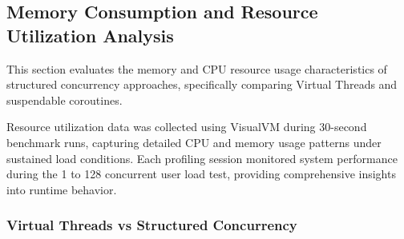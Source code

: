 \subsection{Memory Consumption and Resource Utilization Analysis}
\label{sec:memory-analysis}

This section evaluates the memory and CPU resource usage characteristics of
structured concurrency approaches, specifically comparing Virtual Threads and
suspendable coroutines.

Resource utilization data was collected using VisualVM during 30-second
benchmark runs, capturing detailed CPU and memory usage patterns under
sustained load conditions. Each profiling session monitored system performance
during the 1 to 128 concurrent user load test, providing comprehensive insights
into runtime behavior.

\subsubsection{Virtual Threads vs Structured Concurrency}

